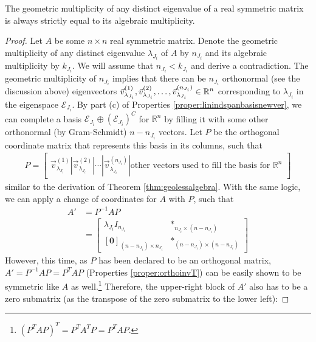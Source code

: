 \begin{proper}
\label{proper:symnodefic}
The geometric multiplicity of any distinct eigenvalue of a real symmetric matrix is always strictly equal to its algebraic multiplicity.
\end{proper}
\begin{proof}
Let $A$ be some $n \times n$ real symmetric matrix. Denote the geometric multiplicity of any distinct eigenvalue $\lambda_{J_i}$ of $A$ by $n_{J_i}$ and its algebraic multiplicity by $k_{J_i}$. We will assume that $n_{J_i} < k_{J_i}$ and derive a contradiction. The geometric multiplicity of $n_{J_i}$ implies that there can be $n_{J_i}$ orthonormal (see the discussion above) eigenvectors $\smash{\vec{v}^{(1)}_{\lambda_{J_i}}}, \smash{\vec{v}^{(2)}_{\lambda_{J_i}}}, \ldots, \smash{\vec{v}^{(n_{J_i})}_{\lambda_{J_i}}} \in \mathbb{R}^n$ corresponding to $\lambda_{J_i}$ in the eigenspace $\mathcal{E}_{J_i}$. By part (c) of Properties \ref{proper:linindspanbasisnewver}, we can complete a basis $\mathcal{E}_{J_i} \oplus (\mathcal{E}_{J_i})^C$ for $\mathbb{R}^n$ by filling it with some other orthonormal (by Gram-Schmidt) $n-n_{J_i}$ vectors. Let $P$ be the orthogonal coordinate matrix that represents this basis in its columns, such that
\begin{align*}
P = \begin{bmatrix}
\vec{v}^{(1)}_{\lambda_{J_i}} | \vec{v}^{(2)}_{\lambda_{J_i}} | \cdots | \vec{v}^{(n_{J_i})}_{\lambda_{J_i}} | \text{other vectors used to fill the basis for $\mathbb{R}^n$}
\end{bmatrix}
\end{align*}
similar to the derivation of Theorem \ref{thm:geolessalgebra}. With the same logic, we can apply a change of coordinates for $A$ with $P$, such that
\begin{align*}
A' &= P^{-1}AP \\
&= \begin{bmatrix}
\lambda_{J_i} I_{n_{J_i}} & *_{n_{J_i}\times(n-n_{J_i})} \\
[\textbf{0}]_{(n-n_{J_i})\times n_{J_i}} & *_{(n-n_{J_i})\times(n-n_{J_i})}
\end{bmatrix}
\end{align*}
However, this time, as $P$ has been declared to be an orthogonal matrix, $A' = P^{-1}AP = P^TAP$ (Properties \ref{proper:orthoinvT}) can be easily shown to be symmetric like $A$ as well.\footnote{$(P^TAP)^T = P^TA^TP = P^TAP$.} Therefore, the upper-right block of $A'$ also has to be a zero submatrix (as the transpose of the zero submatrix to the lower left):

\end{proof}
